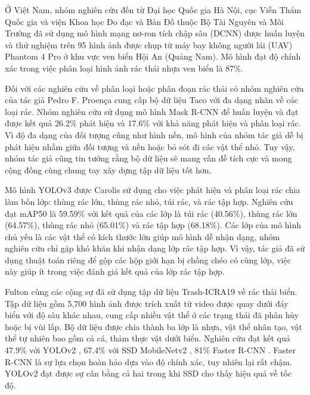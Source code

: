\documentclass[../the.tex]{subfiles}
\begin{document}
\bigskip

{\fontsize{13}{12} \selectfont

	Ở Việt Nam, nhóm nghiên cứu đến từ Đại học Quốc gia Hà Nội, cục Viễn
	Thám Quốc gia và viện Khoa học Đo đạc và Bản Đồ thuộc Bộ Tài Nguyên và
	Môi Trường \cite{nhung2021nghien} đã sử dụng mô hình mạng nơ-ron tích chập sâu (DCNN) được
	huấn luyện và thử nghiệm trên 95 hình ảnh được chụp từ máy bay không người
	lái (UAV) Phantom 4 Pro ở khu vực ven biển Hội An (Quảng Nam). Mô hình
	đạt độ chính xác trong việc phân loại hình ảnh rác thải nhựa ven biển là 87\%.

}

\bigskip

{\fontsize{13}{12} \selectfont

	Đối với các nghiên cứu về phân loại hoặc phân đoạn rác thải có nhóm nghiên cứu của tác giả Pedro F. Proença \cite{proença2020taco} cung cấp bộ dữ liệu Taco với đa dạng nhãn về các loại rác.
	Nhóm nghiên cứu sử dụng mô hình Mask R-CNN để huấn luyện và đạt được kết quả 26.2\% phát hiện và 17.6\% với khả năng phát hiện và phân loại rác.
	Vì độ đa dạng của đối tượng cũng như hình nền, mô hình của nhóm tác giả dễ bị phát hiện nhầm giữa đối tượng và nền hoặc bỏ sót đi các vật thể nhỏ. Tuy vậy, nhóm tác giả cũng tin tưởng rằng bộ dữ liệu sẽ mang vấn đề tích cực và mong cộng đồng cùng chung tay xây dựng tập dữ liệu tốt hơn.

}

\bigskip

{\fontsize{13}{12} \selectfont

	Mô hình YOLOv3 \cite{redmon2018yolov3} được Carolis \etal \cite{9122693} sử dụng cho việc phát hiện và phân loại rác chia làm bốn lớp: thùng rác lớn, thùng rác nhỏ, túi rác, và rác tập hợp.
	Nghiên cứu đạt mAP50 là 59.59\% với kết quả của các lớp là túi rác (40.56\%), thùng rác lớn (64.57\%), thùng rác nhỏ (65.01\%) và rác tập hợp (68.18\%).
	Các lớp của mô hình chủ yếu là các vật thể có kích thước lớn giúp mô hình dễ nhận dạng, nhóm nghiên cứu chỉ gặp khó khăn khi nhận dạng lớp rác tập hợp.
	Vì vậy, tác giả đã sử dụng thuật toán riêng để gộp các hộp giới hạn bị chồng chéo có cùng lớp, việc này giúp ít trong việc đánh giá kết quả của lớp rác tập hợp.

}

\bigskip

{\fontsize{13}{12} \selectfont
	Fulton cùng các cộng sự \cite{8793975} đã sử dụng tập dữ liệu Trash-ICRA19 về rác thải biển. Tập dữ liệu gồm 5,700 hình ảnh được trích xuất từ video được quay dưới đáy biển với độ sâu khác nhau,
	cung cấp nhiều vật thể ở các trạng thái đã phân hủy hoặc bị vùi lấp.
	Bộ dữ liệu được chia thành ba lớp là nhựa, vật thể nhân tạo, vật thể tự nhiên bao gồm cả cá, thảm thực vật dưới biển.
	Nghiên cứu đạt kết quả 47.9\% với YOLOv2 \cite{redmon2016yolo9000}, 67.4\% với SSD MobileNetv2 \cite{sandler2019mobilenetv2} , 81\% Faster R-CNN \cite{ren2016faster}.
	Faster R-CNN là sự lựa chọn hoàn hảo dựa vào độ chính xác, tuy nhiên lại rất chậm. YOLOv2 đạt được sự cân bằng cả hai trong khi SSD cho thấy hiệu quả về tốc độ.

}
\end{document}
